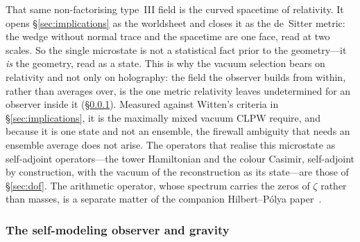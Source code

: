 That same non-factorising type~III field is the curved spacetime of relativity. It opens \S\ref{sec:implications} as the worldsheet and closes it as the de~Sitter metric: the wedge without normal trace and the spacetime are one face, read at two scales. So the single microstate is not a statistical fact prior to the geometry---it \emph{is} the geometry, read as a state. This is why the vacuum selection bears on relativity and not only on holography: the field the observer builds from within, rather than averages over, is the one metric relativity leaves undetermined for an observer inside it (\S\ref{sssec:disc-observer}). Measured against Witten's criteria in \S\ref{sec:implications}, it is the maximally mixed vacuum CLPW require, and because it is one state and not an ensemble, the firewall ambiguity that needs an ensemble average does not arise. The operators that realise this microstate as self-adjoint operators---the tower Hamiltonian and the colour Casimir, self-adjoint by construction, with the vacuum of the reconstruction as its state---are those of \S\ref{sec:dof}. The arithmetic operator, whose spectrum carries the zeros of $\zeta$ rather than masses, is a separate matter of the companion Hilbert--P\'olya paper~\cite{HP}.

\subsubsection{The self-modeling observer and gravity}\label{sssec:disc-observer}

